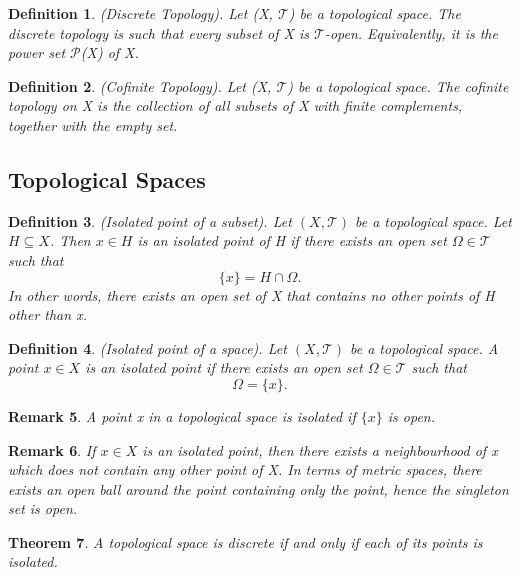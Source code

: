 \documentclass[twoside]{article}
\newcounter{lecnum}
\newtheorem{theorem}{Theorem}[lecnum]
\newtheorem{definition}[theorem]{Definition}
\newtheorem{remark}[theorem]{Remark}
\begin{document}
\begin{definition}(Discrete Topology). Let (X, $\mathcal{T}$) be a topological space. The discrete topology is such that every subset of X is $\mathcal{T}$-open. Equivalently, it is the power set $\mathcal{P}$(X) of X.
\end{definition}

\begin{definition}(Cofinite Topology). Let (X, $\mathcal{T}$) be a topological space. The cofinite topology on X is the collection of all subsets of X with finite complements, together with the empty set.
\end{definition}

\subsection{Topological Spaces}

\begin{definition}(Isolated point of a subset). Let $(X, \mathcal{T})$ be a topological space. Let $H \subseteq X$. Then $x \in H$ is an isolated point of H if there exists an open set $\Omega \in \mathcal{T}$ such that 
$$
\{x\} = H \cap \Omega.
$$
In other words, there exists an open set of X that contains no other points of H other than x.
\end{definition}

\begin{definition}(Isolated point of a space). Let $(X, \mathcal{T})$ be a topological space. A point $x \in X$ is an isolated point if there exists an open set $\Omega \in \mathcal{T}$ such that 
$$
\Omega = \{x\}.
$$
\end{definition}

\begin{remark}A point x in a topological space is isolated if $\{x\}$ is open.
\end{remark}

\begin{remark} If $x \in X$ is an isolated point, then there exists a neighbourhood of x which does not contain any other point of X. In terms of metric spaces, there exists an open ball around the point containing only the point, hence the singleton set is open.
\end{remark}


\begin{theorem}A topological space is discrete if and only if each of its points is isolated.
\end{theorem}
\end{document}
